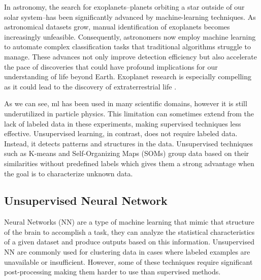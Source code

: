 In astronomy, the search for exoplanets--planets orbiting a star outside of our solar system--has been significantly advanced by machine-learning techniques. As astronomical datasets grow, manual identification of exoplanets becomes increasingly unfeasible. Consequently, astronomers now employ machine learning to automate complex classification tasks that traditional algorithms struggle to manage. These advances not only improve detection efficiency but also accelerate the pace of discoveries that could have profound implications for our understanding of life beyond Earth. Exoplanet research is especially compelling as it could lead to the discovery of extraterrestrial life \cite{Rajput2024ExoplanetML}.

As we can see, \acrshort{ml} has been used in many scientific domains, however it is still underutilized in particle physics. This limitation can sometimes extend from the lack of labeled data in these experiments, making supervised techniques less effective. Unsupervised learning, in contrast, does not require labeled data. Instead, it detects patterns and structures in the data.
Unsupervised techniques such as K-means and Self-Organizing Maps (SOMs) group data based on their similarities without predefined labels which gives them a strong advantage when the goal is to characterize unknown data.




\subsection{Unsupervised Neural Network}

Neural Networks (NN) are a type of machine learning that mimic that structure of the brain to accomplish a task, they can analyze the statistical characteristics of a given dataset and produce outputs based on this information. Unsupervised NN are commonly used for clustering data in cases where labeled examples are unavailable or insufficient. However, some of these techniques require significant post-processing making them harder to use than supervised methods.

